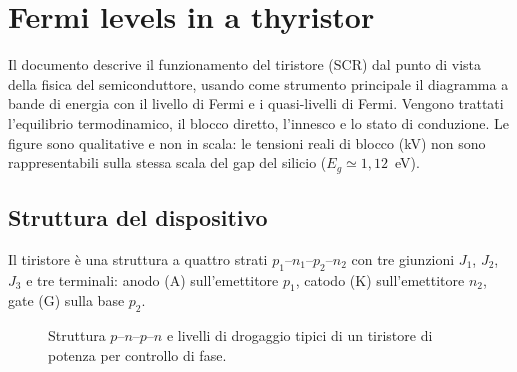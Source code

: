 \chapter{Fermi levels in a thyristor}
\label{ch:thyfermi}
\vspace{-12mm}

\begin{chapabstract}
\noindent
Il documento descrive il funzionamento del tiristore (SCR) dal punto di vista della
fisica del semiconduttore, usando come strumento principale il diagramma a bande di
energia con il livello di Fermi e i quasi-livelli di Fermi. Vengono trattati
l'equilibrio termodinamico, il blocco diretto, l'innesco e lo stato di conduzione.
Le figure sono qualitative e non in scala: le tensioni reali di blocco (kV)
non sono rappresentabili sulla stessa scala del gap del silicio ($E_g \simeq 1{,}12$~eV).
\end{chapabstract}

\section{Struttura del dispositivo}

Il tiristore è una struttura a quattro strati $p_1$--$n_1$--$p_2$--$n_2$ con tre
giunzioni $J_1$, $J_2$, $J_3$ e tre terminali: anodo (A) sull'emettitore $p_1$,
catodo (K) sull'emettitore $n_2$, gate (G) sulla base $p_2$.

\begin{figure}[h]
\centering
{}
\caption{Struttura $p$--$n$--$p$--$n$ e livelli di drogaggio tipici di un tiristore
di potenza per controllo di fase.}
\end{figure}


